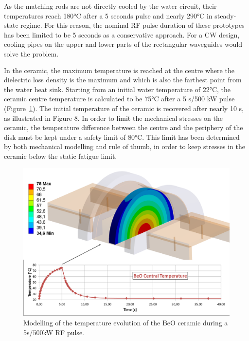 {As the matching rods are not directly cooled by the water circuit, their temperatures reach 180$\si{\degreeCelsius}$ after a 5 seconds pulse and nearly 290$\si{\degreeCelsius}$ in steady-state regime. For this reason, the nominal RF pulse duration of these prototypes has been limited to be 5 seconds as a conservative approach. For a CW design, cooling pipes on the upper and lower parts of the rectangular waveguides would solve the problem.

In the ceramic, the maximum temperature is reached at the centre where the dielectric loss density is the maximum and which is also the farthest point from the water heat sink. Starting from an initial water temperature of 22$\si{\degreeCelsius}$, the ceramic centre temperature is calculated to be 75$\si{\degreeCelsius}$ after a 5 s/500 kW pulse (Figure~\ref{fig:iterwindows_thermal_modeling}). The initial temperature of the ceramic is recovered after nearly 10 s, as illustrated in Figure 8. In order to limit the mechanical stresses on the ceramic, the temperature difference between the centre and the periphery of the disk must be kept under a safety limit of 80$\si{\degreeCelsius}$. This limit has been determined by both mechanical modelling and rule of thumb, in order to keep stresses in the ceramic below the static fatigue limit.

\begin{figure}
	\centering
	\includegraphics[width=1.0\linewidth]{figures/chap3/ITER_window/ITER_windows_thermal_modeling}
	\caption{Modelling of the temperature evolution of the BeO ceramic during a 5s/500kW RF pulse.}
	\label{fig:iterwindows_thermal_modeling}
\end{figure}

}
